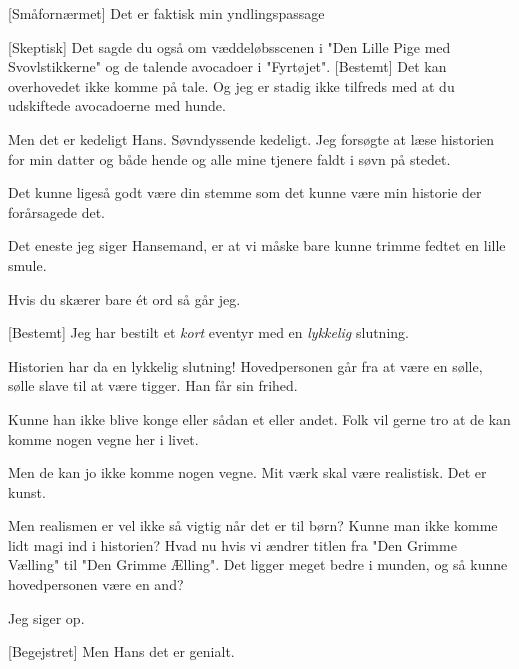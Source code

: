 \documentclass[a4paper,11pt]{article}
\begin{document}
\begin{sketch}
[Småfornærmet] Det er faktisk min yndlingspassage

 [Skeptisk] Det sagde du også om væddeløbsscenen i "Den Lille Pige med Svovlstikkerne" og de talende avocadoer i "Fyrtøjet".
[Bestemt] Det kan overhovedet ikke komme på tale. Og jeg er stadig ikke tilfreds med at du udskiftede avocadoerne med hunde. 

  Men det er kedeligt Hans. Søvndyssende kedeligt. Jeg forsøgte at læse historien for min datter og både hende og alle mine tjenere faldt i søvn på stedet.

 Det kunne ligeså godt være din stemme som det kunne være min historie der forårsagede det.

  Det eneste jeg siger Hansemand, er at vi måske bare kunne trimme fedtet en lille smule. 

 Hvis du skærer bare ét ord så går jeg.








%


%


 [Bestemt] Jeg har bestilt et \emph{kort} eventyr med en \emph{lykkelig} slutning. 

 Historien har da en lykkelig slutning! Hovedpersonen går fra at være en sølle, sølle slave til at være tigger. Han får sin frihed.

  Kunne han ikke blive konge eller sådan et eller andet. Folk vil gerne tro at de kan komme nogen vegne her i livet. 

 Men de kan jo ikke komme nogen vegne. Mit værk skal være realistisk. Det er kunst.


  Men realismen er vel ikke så vigtig når det er til børn? Kunne man ikke komme lidt magi ind i historien? Hvad nu hvis vi ændrer titlen fra "Den Grimme Vælling" til "Den Grimme Ælling". Det ligger meget bedre i munden, og så kunne hovedpersonen være en and?

  Jeg siger op. 

 [Begejstret] Men Hans det er genialt.


\end{sketch}
\end{document}
